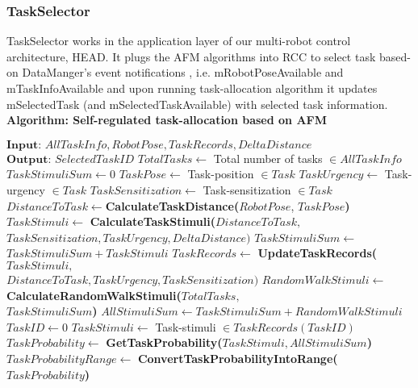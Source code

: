 \subsubsection*{TaskSelector}
TaskSelector works in the application layer of our multi-robot control architecture, HEAD. It plugs the AFM algorithms into RCC to select task based-on DataManger's event notifications , i.e. mRobotPoseAvailable and mTaskInfoAvailable and upon running task-allocation algorithm it updates  mSelectedTask (and mSelectedTaskAvailable) with selected task information.
\textbf{Algorithm: Self-regulated task-allocation based on AFM}
\begin{small}
\begin{algorithmic}[1]
\label{alg:task-selector}
\State $\textbf{Input: } AllTaskInfo, RobotPose, TaskRecords, DeltaDistance$
\State $\textbf{Output: } SelectedTaskID$
\State {}
\State $TotalTasks \gets$  Total number of tasks $\in AllTaskInfo$  
\State $ TaskStimuliSum \gets 0 $
\State $ TaskPose \gets  $ Task-position  $ \in Task$
\State $ TaskUrgency \gets $ Task-urgency $ \in Task$
\State $ TaskSensitization \gets $ Task-sensitization $\in Task$
\State $ DistanceToTask \gets  $\textbf{CalculateTaskDistance(}$RobotPose$, $TaskPose$\textbf{)}
\State $ TaskStimuli \gets  $ \textbf{CalculateTaskStimuli(}$DistanceToTask,$\\ \hspace*{3.5cm} $TaskSensitization, 	        TaskUrgency, DeltaDistance\textbf{)}$
\State $ TaskStimuliSum \gets$  $TaskStimuliSum + TaskStimuli$
\State $ TaskRecords \gets $ \textbf{UpdateTaskRecords(}$TaskStimuli,$\\ \hspace*{3.5cm}$DistanceToTask, TaskUrgency, TaskSensitization\textbf{)}$
\EndFor
\State $RandomWalkStimuli \gets $ \textbf{CalculateRandomWalkStimuli(}$TotalTasks,$\\ \hspace*{4.5cm} $TaskStimuliSum$\textbf{)}
\State $ AllStimuliSum \gets TaskStimuliSum + RandomWalkStimuli $
\State {}
\State $ TaskID \gets 0 $ 
\State $ TaskStimuli \gets $ Task-stimuli $\in TaskRecords(TaskID)$
\State $ TaskProbability \gets  $ \textbf{GetTaskProbability(}$TaskStimuli, AllStimuliSum$\textbf{)}
\State $ TaskProbabilityRange \gets $ \textbf{ConvertTaskProbabilityIntoRange(}\\ \hspace*{6cm}$TaskProbability$\textbf{)}

\end{algorithmic}
\end{small}

